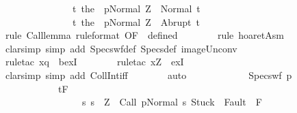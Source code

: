 \begin{isabellebody}
\ \ \ \ \ \ \ \ \ \ \ \ \ \ \ {\isacharbraceleft}t{\isachardot}\ {\isasymGamma}{\isasymturnstile}{\isasymlangle}the\ {\isacharparenleft}{\isasymGamma}\ p{\isacharparenright}{\isacharcomma}Normal\ Z{\isasymrangle}\ {\isasymRightarrow}\ Normal\ t{\isacharbraceright}{\isacharcomma}\isanewline
\ \ \ \ \ \ \ \ \ \ \ \ \ \ \ {\isacharbraceleft}t{\isachardot}\ {\isasymGamma}{\isasymturnstile}{\isasymlangle}the\ {\isacharparenleft}{\isasymGamma}\ p{\isacharparenright}{\isacharcomma}Normal\ Z{\isasymrangle}\ {\isasymRightarrow}\ Abrupt\ t{\isacharbraceright}{\isachardoublequoteclose}\isanewline
\ \ \ \ \ \ \isamarkupfalse%
\ {\isacharparenleft}rule\ Call{\isacharunderscore}lemma\ {\isacharbrackleft}rule{\isacharunderscore}format{\isacharcomma}\ OF\ {\isacharunderscore}\ defined{\isacharbrackright}{\isacharparenright}\isanewline
\ \ \ \ \ \ \isamarkupfalse%
\ {\isacharparenleft}rule\ hoaret{\isachardot}Asm{\isacharparenright}\isanewline
\ \ \ \ \ \ \isamarkupfalse%
\ {\isacharparenleft}clarsimp\ simp\ add{\isacharcolon}\ Specs{\isacharunderscore}wf{\isacharunderscore}def\ Specs{\isacharunderscore}def\ image{\isacharunderscore}Un{\isacharunderscore}conv{\isacharparenright}\isanewline
\ \ \ \ \ \ \isamarkupfalse%
\ {\isacharparenleft}rule{\isacharunderscore}tac\ x{\isacharequal}q\ \ bexI{\isacharparenright}\isanewline
\ \ \ \ \ \ \isamarkupfalse%
\ {\isacharparenleft}rule{\isacharunderscore}tac\ x{\isacharequal}Z\ \ exI{\isacharparenright}\isanewline
\ \ \ \ \ \ \isamarkupfalse%
\ {\isacharparenleft}clarsimp\ simp\ add{\isacharcolon}\ CollInt{\isacharunderscore}iff{\isacharparenright}\isanewline
\ \ \ \ \ \ \isamarkupfalse%
\ auto\isanewline
\ \ \ \ \ \ \isamarkupfalse%
\isanewline
\ \ \ \ \isamarkupfalse%
\ {\isachardoublequoteopen}{\isasymGamma}{\isacharcomma}Specs{\isacharunderscore}wf\ p\ {\isasymsigma}\isanewline
\ \ \ \ \ \ \ \ \ \ \ \ {\isasymturnstile}\isactrlsub t\isactrlbsub {\isacharslash}F\isactrlesub {\isacharparenleft}{\isacharbraceleft}{\isasymsigma}{\isacharbraceright}\ {\isasyminter}\isanewline
\ \ \ \ \ \ \ \ \ \ \ \ \ \ \ \ \ {\isacharbraceleft}s{\isachardot}\ s\ {\isacharequal}\ Z\ {\isasymand}\ {\isasymGamma}{\isasymturnstile}{\isasymlangle}Call\ p{\isacharcomma}Normal\ s{\isasymrangle}\ {\isasymRightarrow}{\isasymnotin}{\isacharparenleft}{\isacharbraceleft}Stuck{\isacharbraceright}\ {\isasymunion}\ Fault\ {\isacharbackquote}\ {\isacharparenleft}{\isacharminus}F{\isacharparenright}{\isacharparenright}\ {\isasymand}\ \isanewline

\end{isabellebody}
